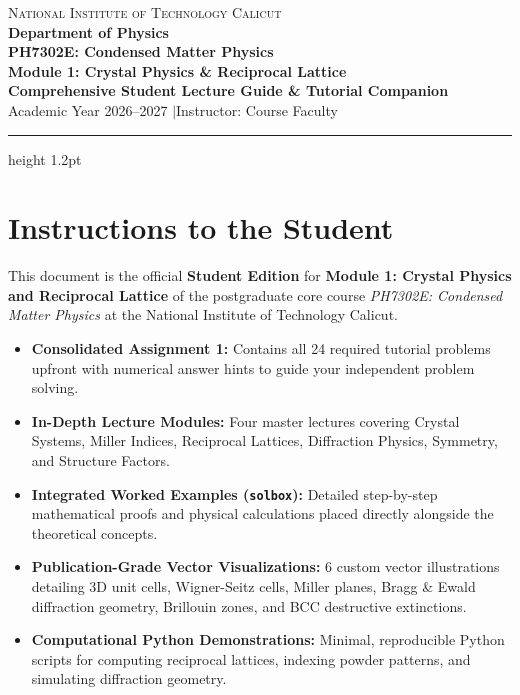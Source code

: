 \documentclass[11pt,a4paper]{article}
\begin{document}
\begin{center}
    {\large \textsc{National Institute of Technology Calicut}}\\[0.2cm]
    {\large \textbf{Department of Physics}}\\[0.3cm]
    {\huge \bfseries \color{ntccblue} PH7302E: Condensed Matter Physics}\\[0.25cm]
    {\Large \bfseries \color{ntccgold} Module 1: Crystal Physics \& Reciprocal Lattice}\\[0.2cm]
    {\normalsize \textbf{Comprehensive Student Lecture Guide \& Tutorial Companion}}\\[0.2cm]
    {\small Academic Year 2026--2027 \quad$\vert$\quad Instructor: Course Faculty}
\end{center}
\vspace{0.2cm}
\hrule height 1.2pt
\vspace{0.5cm}

\tableofcontents
\newpage

\section*{Instructions to the Student}

This document is the official \textbf{Student Edition} for \textbf{Module 1: Crystal Physics and Reciprocal Lattice} of the postgraduate core course \emph{PH7302E: Condensed Matter Physics} at the National Institute of Technology Calicut. 

\begin{keybox}
\begin{itemize}[leftmargin=1.5em]
    \item \textbf{Consolidated Assignment 1:} Contains all 24 required tutorial problems upfront with numerical answer hints to guide your independent problem solving.
    \item \textbf{In-Depth Lecture Modules:} Four master lectures covering Crystal Systems, Miller Indices, Reciprocal Lattices, Diffraction Physics, Symmetry, and Structure Factors.
    \item \textbf{Integrated Worked Examples (\texttt{solbox}):} Detailed step-by-step mathematical proofs and physical calculations placed directly alongside the theoretical concepts.
    \item \textbf{Publication-Grade Vector Visualizations:} 6 custom vector illustrations detailing 3D unit cells, Wigner-Seitz cells, Miller planes, Bragg \& Ewald diffraction geometry, Brillouin zones, and BCC destructive extinctions.
    \item \textbf{Computational Python Demonstrations:} Minimal, reproducible Python scripts for computing reciprocal lattices, indexing powder patterns, and simulating diffraction geometry.
\end{itemize}
\end{keybox}
\end{document}
